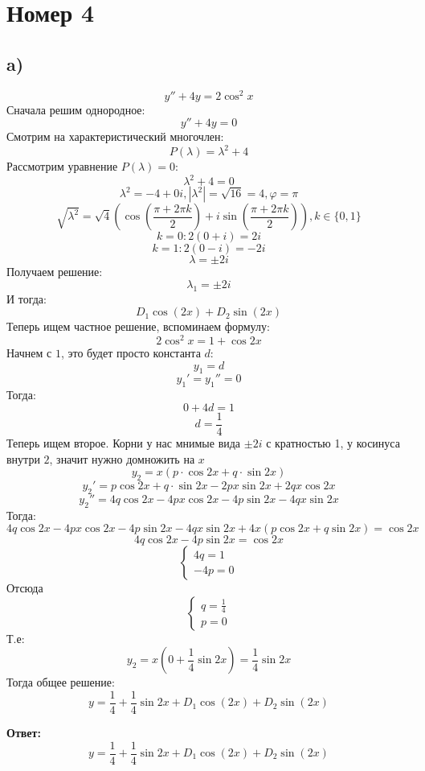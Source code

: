 \documentclass[a4paper, 12pt]{article}
\begin{document}
\section*{Номер 4}
\subsection*{a)}
\[
y'' + 4y = 2 \cos^2x
\]
Сначала решим однородное:
\[
y'' + 4y = 0
\]
Смотрим на характеристический многочлен:
\[
P(\lambda) = \lambda^2 + 4 
\]
Рассмотрим уравнение $P(\lambda) = 0$:
\[
\lambda^2 + 4 = 0
\]
\[
\lambda^2 = -4 + 0i, |\lambda^2| = \sqrt{16} = 4, \varphi = \pi
\]
\[
\sqrt{\lambda^2} = 
\sqrt{4} 
\left(
\cos 
\left(
\frac{\pi + 2 \pi k}{2}
\right)
+i
\sin
\left(
\frac{\pi + 2 \pi k}{2}
\right)
\right), k \in \{0, 1\}
\]
\[
k = 0 : 2(0 + i) = 2i 
\]
\[
k = 1: 2(0 - i) = -2i
\]
\[
\lambda = \pm 2i
\]
Получаем решение:
\[
\lambda_1 = \pm 2i
\]
И тогда:
\[
D_1 \cos (2x) + D_2 \sin (2x)
\]
Теперь ищем частное решение, вспоминаем формулу:
\[
2 \cos^2x = 1 + \cos 2x
\]
Начнем с $1$, это будет просто константа $d$:
\[
y_1 = d
\]
\[
y_1' = y_1'' = 0
\]
Тогда:
\[
0 + 4d = 1
\]
\[
d = \frac{1}{4}
\]
Теперь ищем второе. Корни у нас мнимые вида $\pm 2i$ с кратностью 1, у косинуса внутри $2$, значит  нужно домножить на $x$
\[
y_2 = x 
\left(
p \cdot \cos 2x + q \cdot \sin 2x
\right)
\]
\[
y_2' = p\cos 2x + q\cdot \sin 2x -2px \sin 2x  + 2 qx\cos 2x
\]
\[
y_2'' = 4q \cos 2x - 4px \cos 2x - 4 p \sin 2x  - 4 qx \sin 2x
\]
Тогда:
\[
4q \cos 2x - 4px \cos 2x - 4 p \sin 2x  - 4 qx \sin 2x + 4x(p \cos2x + q \sin 2x) = \cos 2x
\]
\[
4q \cos 2x -4 p \sin 2x = \cos 2x
\]
\[
\begin{cases}
4q = 1 \\
-4p = 0 
\end{cases}
\]
Отсюда
\[
\begin{cases}
q = \frac{1}{4} \\
p = 0
\end{cases}
\]
Т.е:
\[
y_2 = x(0 + \frac{1}{4} \sin 2x) = \frac{1}{4} \sin 2x
\]
Тогда общее решение:
\[
y = \frac{1}{4} + \frac{1}{4} \sin 2x + D_1 \cos (2x) + D_2 \sin (2x)
\]
\begin{center}
\textbf{Ответ: } 
\[
y = \frac{1}{4} + \frac{1}{4} \sin 2x + D_1 \cos (2x) + D_2 \sin (2x)
\]
\end{center}
\clearpage
\end{document}
